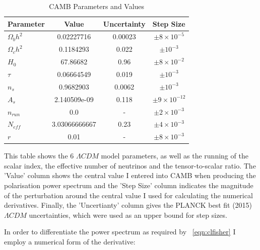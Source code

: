 \begin{table}[h]
\centering
\caption{CAMB Parameters and Values}
\label{table:camb}
\begin{tabular}{l|l|l|l}
Parameter & \multicolumn{1}{c|}{Value} & Uncertainty & Step Size \\ \hline
$\Omega_{b}h^{2}$ & \multicolumn{1}{c|}{0.02227716} & \multicolumn{1}{c|}{0.00023} & \multicolumn{1}{c}{$\pm 8 \times 10^{-5}$}  \\
$\Omega_{c}h^{2}$ & \multicolumn{1}{c|}{0.1184293} & \multicolumn{1}{c|}{0.022} & \multicolumn{1}{c}{$\pm 10^{-3}$}  \\
$H_0$ & \multicolumn{1}{c|}{67.86682} & \multicolumn{1}{c|}{0.96} & \multicolumn{1}{c}{$\pm 8 \times 10^{-2}$}  \\
$\tau$ & \multicolumn{1}{c|}{0.06664549} & \multicolumn{1}{c|}{0.019} & \multicolumn{1}{c}{$\pm 10^{-3}$}  \\
$n_s$ & \multicolumn{1}{c|}{0.9682903} & \multicolumn{1}{c|}{0.0062} & \multicolumn{1}{c}{$\pm 10^{-3}$}  \\
$A_s$ & \multicolumn{1}{c|}{2.140509e-09} & \multicolumn{1}{c|}{0.118} & \multicolumn{1}{c}{$\pm 9 \times 10^{-12}$}  \\
$n_{run}$ & \multicolumn{1}{c|}{0.0} & \multicolumn{1}{c|}{-} & \multicolumn{1}{c}{$\pm 2 \times 10^{-3}$}  \\
$N_{eff}$ & \multicolumn{1}{c|}{3.03066666667} & \multicolumn{1}{c|}{0.23} & \multicolumn{1}{c}{$\pm 4 \times 10^{-3}$}  \\
$r$ & \multicolumn{1}{c|}{0.01} & \multicolumn{1}{c|}{-} & \multicolumn{1}{c}{$\pm 8 \times 10^{-3}$} 
\end{tabular}

\bigskip
This table shows the 6 $\Lambda CDM$ model parameters, as well as the running of the scalar index, the effective number of neutrinos and the tensor-to-scalar ratio. The 'Value' column shows the central value I entered into CAMB when producing the polarisation power spectrum and the 'Step Size' column indicates the magnitude of the perturbation around the central value I used for calculating the numerical derivatives. Finally, the 'Uncertianty' column gives the PLANCK best fit (2015) \cite{Ade:2015xua} $\Lambda CDM$ uncertainties, which were used as an upper bound for step sizes.
\end{table}
 

In order to differentiate the power spectrum as required by ~\ref{eqn:clfisher} I employ a numerical form of the derivative:

